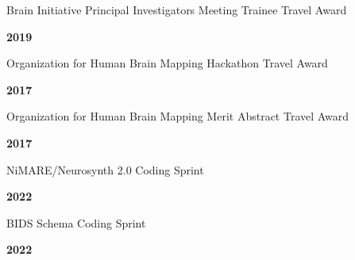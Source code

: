 \documentclass[10pt]{article}
\newcommand{\sectionstyle}{\LARGE \fontfamily{lmr}\selectfont}
\begin{document}
\bigskip

\begin{center}\sectionstyle{HONORS AND AWARDS}\end{center}

\begin{minipage}[t]{.85\linewidth}
	\flushleft
	\noindent
	Brain Initiative Principal Investigators Meeting Trainee Travel Award
\end{minipage}
\hfill
\begin{minipage}[t]{.15\linewidth}
	\flushright
	\noindent
	\textsc{\textbf{2019}}
\end{minipage}

\begin{minipage}[t]{.85\linewidth}
	\flushleft
	\noindent
	Organization for Human Brain Mapping Hackathon Travel Award
\end{minipage}
\hfill
\begin{minipage}[t]{.15\linewidth}
	\flushright
	\noindent
	\textsc{\textbf{2017}}
\end{minipage}

\begin{minipage}[t]{.85\linewidth}
	\flushleft
	\noindent
	Organization for Human Brain Mapping Merit Abstract Travel Award
\end{minipage}
\hfill
\begin{minipage}[t]{.15\linewidth}
	\flushright
	\noindent
	\textsc{\textbf{2017}}
\end{minipage}

\bigskip

\begin{center}\sectionstyle{HACKATHONS AND TRAINING}\end{center}

\begin{minipage}[t]{.85\linewidth}
	\flushleft
	\noindent
	NiMARE/Neurosynth 2.0 Coding Sprint
	\end{minipage}
	\hfill
	\begin{minipage}[t]{.15\linewidth}
	\flushright
	\noindent
	\textsc{\textbf{2022}}
\end{minipage}

\begin{minipage}[t]{.85\linewidth}
	\flushleft
	\noindent
	BIDS Schema Coding Sprint
	\end{minipage}
	\hfill
	\begin{minipage}[t]{.15\linewidth}
	\flushright
	\noindent
	\textsc{\textbf{2022}}
\end{minipage}
\end{document}
